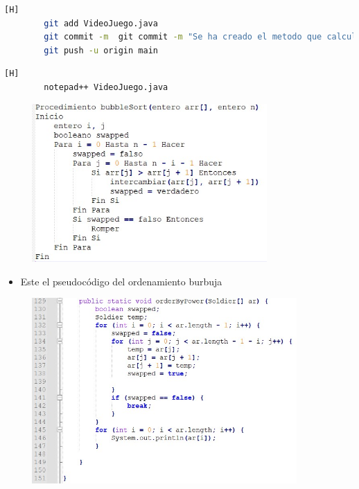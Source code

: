 \documentclass{article}
\begin{document}
		
	\begin{lstlisting}[language=bash,caption={Commit: "Se ha creado el metodo que calcula el promedio y total de los puntos de vida" }][H]
		git add VideoJuego.java
		git commit -m  git commit -m "Se ha creado el metodo que calcula el promedio y total de los puntos de vida"
		git push -u origin main
	\end{lstlisting}
		
		
	
		
		
	
		
	
	\begin{lstlisting}[language=bash,caption={ Método burbuja que muestra el ranking de poder (vida) }][H]
		notepad++ VideoJuego.java	
	\end{lstlisting}
	
	
	\begin{figure}[H]
		\centering
		\includegraphics[width=0.8\textwidth,keepaspectratio]{img/burbuja.jpg}
	\end{figure}

	
	\begin{itemize}	
		\item Este el pseudocódigo del ordenamiento burbuja 
	\end{itemize}
	
	\begin{figure}[H]
		\centering
		\includegraphics[width=0.9\textwidth,keepaspectratio]{img/9.jpg}
	\end{figure}
	
\end{document}
